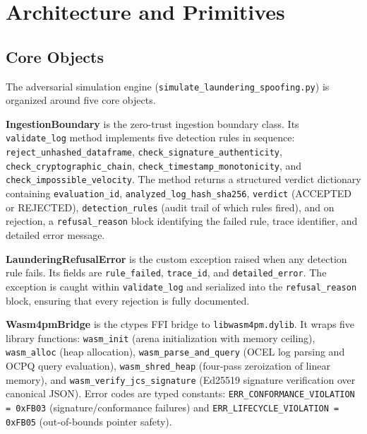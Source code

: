 
\section{Architecture and Primitives}
\label{sec:adversarial-architecture}

\subsection{Core Objects}
\label{sec:adversarial-architecture-objects}

The adversarial simulation engine (\texttt{simulate\_laundering\_spoofing.py}) is organized
around five core objects.

\textbf{IngestionBoundary} is the zero-trust ingestion boundary class. Its \texttt{validate\_log}
method implements five detection rules in sequence: \texttt{reject\_unhashed\_dataframe},
\texttt{check\_signature\_authenticity}, \texttt{check\_cryptographic\_chain},
\texttt{check\_timestamp\_monotonicity}, and \texttt{check\_impossible\_velocity}. The method
returns a structured verdict dictionary containing \texttt{evaluation\_id},
\texttt{analyzed\_log\_hash\_sha256}, \texttt{verdict} (ACCEPTED or REJECTED),
\texttt{detection\_rules} (audit trail of which rules fired), and on rejection, a
\texttt{refusal\_reason} block identifying the failed rule, trace identifier, and detailed
error message.

\textbf{LaunderingRefusalError} is the custom exception raised when any detection rule fails.
Its fields are \texttt{rule\_failed}, \texttt{trace\_id}, and \texttt{detailed\_error}. The
exception is caught within \texttt{validate\_log} and serialized into the
\texttt{refusal\_reason} block, ensuring that every rejection is fully documented.

\textbf{Wasm4pmBridge} is the ctypes FFI bridge to \texttt{libwasm4pm.dylib}. It wraps five
library functions: \texttt{wasm\_init} (arena initialization with memory ceiling),
\texttt{wasm\_alloc} (heap allocation), \texttt{wasm\_parse\_and\_query} (OCEL log parsing
and OCPQ query evaluation), \texttt{wasm\_shred\_heap} (four-pass zeroization of linear
memory), and \texttt{wasm\_verify\_jcs\_signature} (Ed25519 signature verification over
canonical JSON). Error codes are typed constants: \texttt{ERR\_CONFORMANCE\_VIOLATION =
0xFB03} (signature/conformance failures) and \texttt{ERR\_LIFECYCLE\_VIOLATION = 0xFB05}
(out-of-bounds pointer safety).

